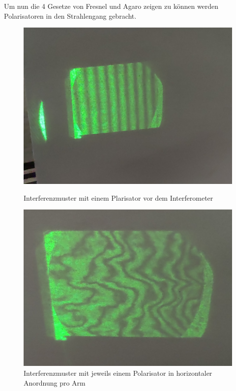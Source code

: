 \documentclass[ngerman]{scrartcl}
\begin{document}
Um nun die 4 Gesetze von Fresnel und Agaro zeigen zu können werden Polarisatoren in den Strahlengang gebracht.
\setcapindent{0pt}
\begin{figure}[H]
    \centering
    \begin{minipage}[t]{0.45\linewidth}
        \centering
        \includegraphics[width=\linewidth]{fig/Out_horizontal_detail.jpg} %
        \caption{Interferenzmuster mit einem Plarisator vor dem Interferometer}
        \label{fig:michelson_pol_vor}
    \end{minipage}%
    \hspace*{\fill}
    \begin{minipage}[t]{0.45\linewidth}
        \centering
        \includegraphics[width=\linewidth]{fig/Arago_2_Horizontal_detail.jpg}
        \caption{Interferenzmuster mit jeweils einem Polarisator in horizontaler Anordnung pro Arm}
        \label{fig:michelson_pol_2_horizontal}
    \end{minipage}
\end{figure}
\setcaphanging
\end{document}
